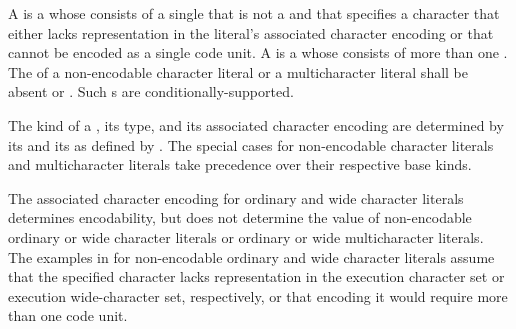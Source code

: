 \pnum
{}%
%
%
%
%
%
%
%
%
%
A 
is a 
whose  consists of a single 
that is not a  and
that specifies a character
that either lacks representation in the literal's associated character encoding
or that cannot be encoded as a single code unit.
A  is a 
whose  consists of
more than one .
The  of
a non-encodable character literal or a multicharacter literal
shall be absent or .
Such s are conditionally-supported.

\pnum
The kind of a ,
its type, and its associated character encoding
are determined by
its  and its 
as defined by .
The special cases for
non-encodable character literals and multicharacter literals
take precedence over their respective base kinds.
\begin{note}
The associated character encoding for ordinary and wide character literals
determines encodability,
but does not determine the value of
non-encodable ordinary or wide character literals or
ordinary or wide multicharacter literals.
The examples in 
for non-encodable ordinary and wide character literals assume that
the specified character lacks representation in
the execution character set or execution wide-character set, respectively, or
that encoding it would require more than one code unit.
\end{note}

